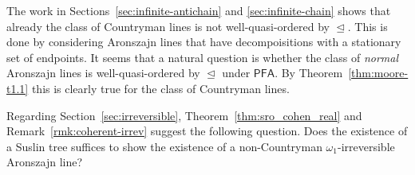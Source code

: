 \documentclass[10pt]{amsart}
\theoremstyle{definition}
\theoremstyle{remark}
\newcommand{\axiom}[1]{\mathsf{#1}}
\newcommand{\PFA}{\axiom{PFA}}
\newcommand{\sleq}{\trianglelefteq}
\newcommand{\1}{\mathbbm{1}}
\begin{document}
The work in Sections~\ref{sec:infinite-antichain} and \ref{sec:infinite-chain} shows
that already the class of Countryman lines is not well-quasi-ordered by
$\sleq$. This is done by considering Aronszajn lines that have
decompoisitions with a stationary set of endpoints. It seems that a natural
question is whether the class of \textit{normal} Aronszajn lines is
well-quasi-ordered by $\sleq$ under $\PFA$. By Theorem~\ref{thm:moore-t1.1}
this is clearly true for the class of Countryman lines.

Regarding Section~\ref{sec:irreversible}, Theorem~\ref{thm:sro_cohen_real} and
 Remark~\ref{rmk:coherent-irrev} suggest the following question. Does the
existence of a Suslin tree suffices to show the existence of a
non-Countryman $\omega_{1}$-irreversible Aronszajn line?


\end{document}
